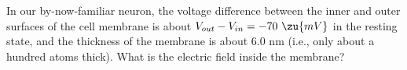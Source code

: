         In our by-now-familiar neuron, the voltage difference
        between the inner and outer surfaces of the cell membrane is
        about $V_{out}-V_{in}=-70\ \zu{mV}$ in the resting state, and the
        thickness of the membrane is about 6.0 nm (i.e., only about a
        hundred atoms thick).  What is the electric field inside the membrane?\answercheck
